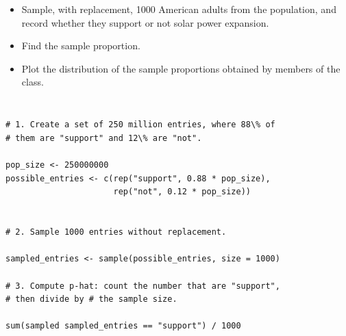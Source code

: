 \begin{frame}
\frametitle{}


\begin{itemize}

\item Sample, with replacement, 1000 American adults from the population, and record whether they support or not solar power expansion.

\item Find the sample proportion.

\item Plot the distribution of the sample proportions obtained by members of the class.

\end{itemize}

\end{frame}


\begin{frame}[fragile]
\frametitle{}

\begin{beamerboxesrounded}[shadow = true, lower = code body]{}
{
\small 
\begin{verbatim}

# 1. Create a set of 250 million entries, where 88\% of 
# them are "support" and 12\% are "not".

pop_size <- 250000000
possible_entries <- c(rep("support", 0.88 * pop_size), 
                      rep("not", 0.12 * pop_size))


# 2. Sample 1000 entries without replacement.

sampled_entries <- sample(possible_entries, size = 1000)

# 3. Compute p-hat: count the number that are "support", 
# then divide by # the sample size.

sum(sampled sampled_entries == "support") / 1000

\end{verbatim}
}
\end{beamerboxesrounded}

\end{frame}


